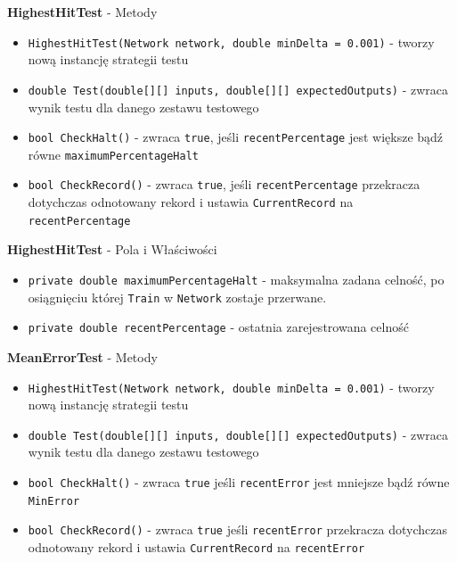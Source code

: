 \documentclass[12pt,a4paper]{article}
\begin{document}
    
    \textbf{HighestHitTest} - Metody
    \begin{itemize}
        \item \lstinline{HighestHitTest(Network network, double minDelta = 0.001)} - tworzy nową instancję strategii testu
        \item \lstinline{double Test(double[][] inputs, double[][] expectedOutputs)} - zwraca wynik testu dla danego zestawu testowego
        \item \lstinline{bool CheckHalt()} - zwraca \lstinline{true}, jeśli \lstinline{recentPercentage} jest większe bądź równe \lstinline{maximumPercentageHalt}
        \item \lstinline{bool CheckRecord()} - zwraca \lstinline{true}, jeśli \lstinline{recentPercentage} przekracza dotychczas odnotowany rekord i ustawia \lstinline{CurrentRecord} na \lstinline{recentPercentage}
    \end{itemize}
    
    \textbf{HighestHitTest} - Pola i Właściwości
    \begin{itemize}
        \item \lstinline|private double maximumPercentageHalt| - maksymalna zadana celność, po osiągnięciu której \lstinline{Train} w \lstinline{Network} zostaje przerwane.
        \item \lstinline|private double recentPercentage| - ostatnia zarejestrowana celność
    \end{itemize}
    
    
    \textbf{MeanErrorTest} - Metody
    \begin{itemize}
         \item \lstinline{HighestHitTest(Network network, double minDelta = 0.001)} - tworzy nową instancję strategii testu
        \item \lstinline{double Test(double[][] inputs, double[][] expectedOutputs)} - zwraca wynik testu dla danego zestawu testowego
        \item \lstinline{bool CheckHalt()} - zwraca \lstinline{true} jeśli \lstinline{recentError} jest mniejsze bądź równe \lstinline{MinError}
        \item \lstinline{bool CheckRecord()} - zwraca \lstinline{true} jeśli \lstinline{recentError} przekracza dotychczas odnotowany rekord i ustawia \lstinline{CurrentRecord} na \lstinline{recentError}
    \end{itemize}
    
\end{document}
